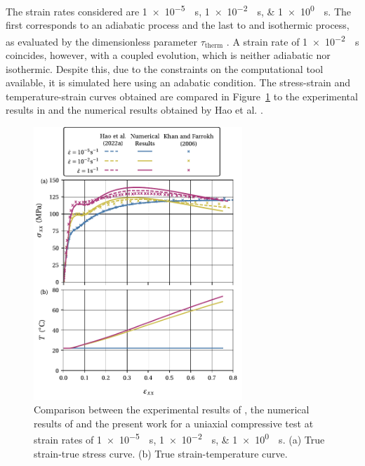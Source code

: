 The strain rates considered are \SIlist{1e-5;1e-2;1e0}{\per\second}.
The first corresponds to an adiabatic process and the last to and isothermic process, as evaluated by the dimensionless parameter $\tau_\text{therm}$ \citep{haoUnifiedAmorphousCrystalline2022}.
A strain rate of \SI{1e-2}{\per\second} coincides, however, with a coupled evolution, which is neither adiabatic nor isothermic.
Despite this, due to the constraints on the computational tool available, it is simulated here using an adabatic condition.
The stress-strain and temperature-strain curves obtained are compared in Figure~\ref{fig:stress_temp_strain_hao_results} to the experimental results in \cite{khanThermomechanicalResponseNylon2006} and the numerical results obtained by Hao et al. \citep{haoUnifiedAmorphousCrystalline2022}.
\begin{figure}[htbp]
  \centering
  \includegraphics[width=0.7\textwidth]{figures/stress_temp_strain_hao_results}
  \caption{Comparison between the experimental results of \cite{khanThermomechanicalResponseNylon2006}, the numerical results of \cite{haoUnifiedAmorphousCrystalline2022} and the present work for a uniaxial compressive test at strain rates of \SIlist{1e-5;1e-2;1e0}{\per\second}. (a) True strain-true stress curve. (b) True strain-temperature curve.}
\label{fig:stress_temp_strain_hao_results}
\end{figure}

